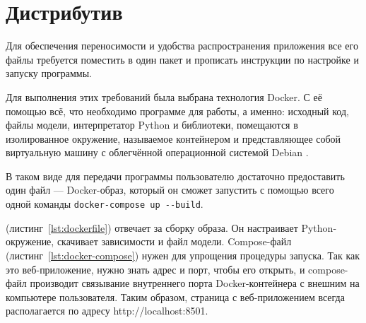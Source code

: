 \section{Дистрибутив}

Для обеспечения переносимости и удобства распространения приложения все его файлы требуется поместить в один пакет и прописать инструкции по настройке и запуску программы.

Для выполнения этих требований была выбрана технология Docker. С её помощью всё, что необходимо программе для работы, а именно: исходный код, файлы модели, интерпретатор Python и библиотеки, помещаются в изолированное окружение, называемое контейнером и представляющее собой виртуальную машину с облегчённой операционной системой Debian \cite{doc:docker}.

В таком виде для передачи программы пользователю достаточно предоставить один файл --- Docker-образ, который он сможет запустить с помощью всего одной команды \verb|docker-compose up --build|.




 (листинг \ref*{lst:dockerfile}) отвечает за сборку образа. Он настраивает Python-окружение, скачивает зависимости и файл модели. Compose-файл (листинг \ref*{lst:docker-compose}) нужен для упрощения процедуры запуска. Так как это веб-приложение, нужно знать адрес и порт, чтобы его открыть, и compose-файл производит связывание внутреннего порта Docker-контейнера с внешним на компьютере пользователя. Таким образом, страница с веб-приложением всегда располагается по адресу http://localhost:8501.
